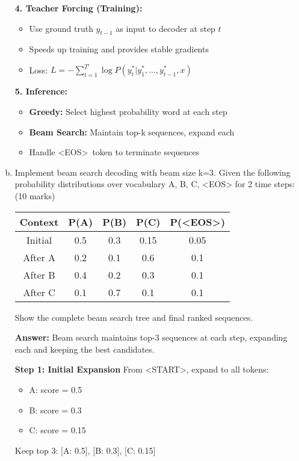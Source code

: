 \documentclass[12pt]{article}
\newcommand{\answer}[1]{{\color{answercolor}\textbf{Answer:} #1}}
\newcommand{\explanation}[1]{{\color{explanationcolor}#1}}
\begin{document}
\begin{enumerate}[(a)]
{    \textbf{4. Teacher Forcing (Training):}
    \begin{itemize}
        \item Use ground truth $y_{t-1}$ as input to decoder at step $t$
        \item Speeds up training and provides stable gradients
        \item Loss: $L = -\sum_{t=1}^{T'} \log P(y_t^* | y_1^*, ..., y_{t-1}^*, x)$
    \end{itemize}
    
    \textbf{5. Inference:}
    \begin{itemize}
        \item \textbf{Greedy:} Select highest probability word at each step
        \item \textbf{Beam Search:} Maintain top-k sequences, expand each
        \item Handle \textless EOS\textgreater\ token to terminate sequences
    \end{itemize}
    }
    
    \item Implement beam search decoding with beam size k=3. Given the following probability distributions over vocabulary {A, B, C, \textless EOS\textgreater} for 2 time steps: \hfill (10 marks)
    
    \begin{center}
    \begin{tabular}{|c|c|c|c|c|}
    \hline
    Context & P(A) & P(B) & P(C) & P(\textless EOS\textgreater) \\
    \hline
    Initial & 0.5 & 0.3 & 0.15 & 0.05 \\
    After A & 0.2 & 0.1 & 0.6 & 0.1 \\
    After B & 0.4 & 0.2 & 0.3 & 0.1 \\
    After C & 0.1 & 0.7 & 0.1 & 0.1 \\
    \hline
    \end{tabular}
    \end{center}
    
    Show the complete beam search tree and final ranked sequences.
    
    \answer{Beam search maintains top-3 sequences at each step, expanding each and keeping the best candidates.}
    
    \explanation{
    \textbf{Step 1: Initial Expansion}
    From \textless START\textgreater, expand to all tokens:
    \begin{itemize}
        \item A: score = 0.5
        \item B: score = 0.3  
        \item C: score = 0.15
    \end{itemize}
    Keep top 3: [A: 0.5], [B: 0.3], [C: 0.15]
    
}
\end{enumerate}
\end{document}
